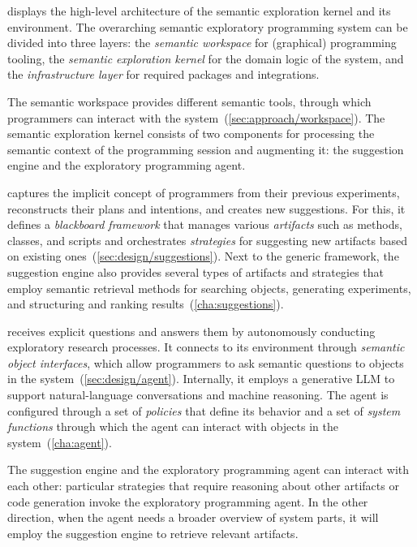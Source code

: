  displays the high-level architecture of the semantic exploration kernel and its environment.
The overarching semantic exploratory programming system can be divided into three layers: the \emph{semantic workspace} for (graphical) programming tooling, the \emph{semantic exploration kernel} for the domain logic of the system, and the \emph{infrastructure layer} for required packages and integrations.

The semantic workspace provides different semantic tools, through which programmers can interact with the system~(\cref{sec:approach/workspace}).
The semantic exploration kernel consists of two components for processing the semantic context of the programming session and augmenting it: the suggestion engine and the exploratory programming agent.

\begin{description}[noextralabelsep]
	\item[The suggestion engine] captures the implicit concept of programmers from their previous experiments, reconstructs their plans and intentions, and creates new suggestions.
	For this, it defines a \emph{blackboard framework} that manages various \emph{artifacts} such as methods, classes, and scripts and orchestrates \emph{strategies} for suggesting new artifacts based on existing ones~(\cref{sec:design/suggestions}).
	Next to the generic framework, the suggestion engine also provides several types of artifacts and strategies that employ semantic retrieval methods for searching objects, generating experiments, and structuring and ranking results~(\cref{cha:suggestions}).
	\item[The exploratory programming agent] receives explicit questions and answers them by autonomously conducting exploratory research processes.
	It connects to its environment through \emph{semantic object interfaces}, which allow programmers to ask semantic questions to objects in the system~(\cref{sec:design/agent}).
	Internally, it employs a generative LLM to support natural-language conversations and machine reasoning.
	The agent is configured through a set of \emph{policies} that define its behavior and a set of \emph{system functions} through which the agent can interact with objects in the system~(\cref{cha:agent}).
\end{description}

The suggestion engine and the exploratory programming agent can interact with each other:
particular strategies that require reasoning about other artifacts or code generation invoke the exploratory programming agent.
In the other direction, when the agent needs a broader overview of system parts, it will employ the suggestion engine to retrieve relevant artifacts.

